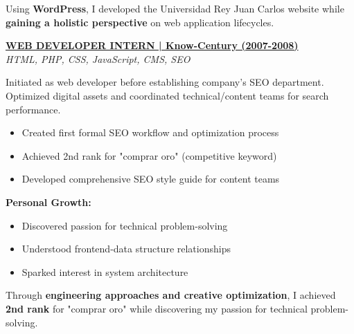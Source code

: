 \documentclass[a4paper,10pt]{article}
\begin{document}
{\begin{minipage}{\dimexpr\textwidth-2\fboxsep\relax}
        Using \textbf{WordPress}, I developed the Universidad Rey Juan Carlos website
        while \textbf{gaining a holistic perspective} on web application lifecycles.

		\vspace{0.4cm}

        \noindent\uline{\textbf{WEB DEVELOPER INTERN | Know-Century (2007-2008)}} \\
		\vspace{0.1cm}
		{\small\textit{HTML, PHP, CSS, JavaScript, CMS, SEO}}
		\vspace{0.2cm}

		Initiated as web developer before establishing company's SEO department. Optimized digital assets and coordinated technical/content teams for search performance.

		\vspace{0.2cm}
		\begin{itemize}[label=\textcolor{darkblue}{\textbullet}, leftmargin=*, nosep]
			\item Created first formal SEO workflow and optimization process
			\item Achieved 2nd rank for "comprar oro" (competitive keyword)
			\item Developed comprehensive SEO style guide for content teams
		\end{itemize}

		\vspace{0.2cm}
		\textbf{Personal Growth:}
		\vspace{0.2cm}
		\begin{itemize}[label=\textcolor{darkblue}{\textbullet}, leftmargin=*, nosep]
			\item Discovered passion for technical problem-solving
			\item Understood frontend-data structure relationships
			\item Sparked interest in system architecture
		\end{itemize}

        \vspace{0.2cm}


        Through \textbf{engineering approaches and creative optimization}, I achieved \textbf{2nd
        rank} for "comprar oro" while discovering my passion for technical problem-solving.


		\vspace{0.2cm} %
\end{minipage}}


\end{document}
